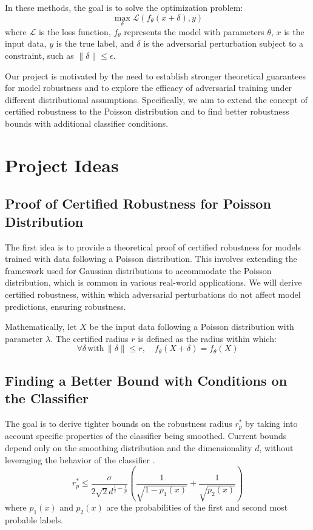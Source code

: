 \documentclass{article}
\begin{document}
In these methods, the goal is to solve the optimization problem:
\begin{equation*}
    \max_{\delta} \mathcal{L}(f_{\theta}(x + \delta), y)
\end{equation*}
where \( \mathcal{L} \) is the loss function, \( f_{\theta} \) represents the model with parameters \( \theta \), \( x \) is the input data, \( y \) is the true label, and \( \delta \) is the adversarial perturbation subject to a constraint, such as \( \|\delta\| \leq \epsilon \).

Our project is motivated by the need to establish stronger theoretical guarantees for model robustness and to explore the efficacy of adversarial training under different distributional assumptions. Specifically, we aim to extend the concept of certified robustness to the Poisson distribution and to find better robustness bounds with additional classifier conditions. 

\section{Project Ideas} 
\subsection{Proof of Certified Robustness for Poisson Distribution} 
The first idea is to provide a theoretical proof of certified robustness for models trained with data following a Poisson distribution. This involves extending the framework used for Gaussian distributions to accommodate the Poisson distribution, which is common in various real-world applications. We will derive certified robustness, within which adversarial perturbations do not affect model predictions, ensuring robustness.

Mathematically, let \( X \) be the input data following a Poisson distribution with parameter \( \lambda \). The certified radius \(r\) is defined as the radius within which:
\begin{equation*}
    \forall \delta \, \text{with} \, \|\delta\| \leq r, \quad f_{\theta}(X + \delta) = f_{\theta}(X)
\end{equation*}

\subsection{Finding a Better Bound with Conditions on the Classifier} The goal is to derive tighter bounds on the robustness radius \(r_p^*\) by taking into account specific properties of the classifier being smoothed. Current bounds depend only on the smoothing distribution and the dimensionality \(d\), without leveraging the behavior of the classifier \cite{curse2024dimensionality}.
$$
r_p^* \leq \frac{\sigma}{2\sqrt{2}d^{\frac{1}{2}-\frac{1}{p}}} ( \frac{1}{\sqrt{1-p_1(x)}} + \frac{1}{\sqrt{p_2(x)}} )
$$
where $p_1(x)$ and
$p_2(x)$ are the probabilities of the first and second most probable labels.
\end{document}
